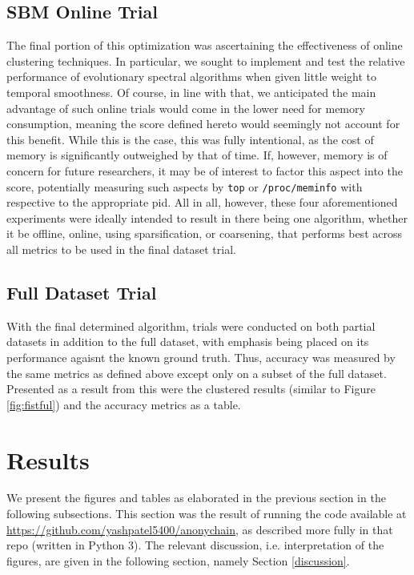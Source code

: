 \documentclass{article}
\begin{document}
\subsection{SBM Online Trial}
The final portion of this optimization was ascertaining the effectiveness of online clustering techniques. In particular, we sought to implement and test the relative performance of evolutionary spectral algorithms when given little weight to temporal smoothness. Of course, in line with that, we anticipated the main advantage of such online trials would come in the lower need for memory consumption, meaning the score defined hereto would seemingly not account for this benefit. While this is the case, this was fully intentional, as the cost of memory is significantly outweighed by that of time. If, however, memory is of concern for future researchers, it may be of interest to factor this aspect into the score, potentially measuring such aspects by \texttt{top} or \texttt{/proc/meminfo} with respective to the appropriate pid. All in all, however, these four aforementioned experiments were ideally intended to result in there being one algorithm, whether it be offline, online, using sparsification, or coarsening, that performs best across all metrics to be used in the final dataset trial. 

\subsection{Full Dataset Trial}
With the final determined algorithm, trials were conducted on both partial datasets in addition to the full dataset, with emphasis being placed on its performance agaisnt the known ground truth. Thus, accuracy was measured by the same metrics as defined above except only on a subset of the full dataset. Presented as a result from this were the clustered results (similar to Figure \ref{fig:fistful}) and the accuracy metrics as a table.

\clearpage
\section{Results}\label{results}
We present the figures and tables as elaborated in the previous section in the following subsections. This section was the result of running the code available at \url{https://github.com/yashpatel5400/anonychain}, as described more fully in that repo (written in Python 3). The relevant discussion, i.e. interpretation of the figures, are given in the following section, namely Section \ref{discussion}.
\end{document}
